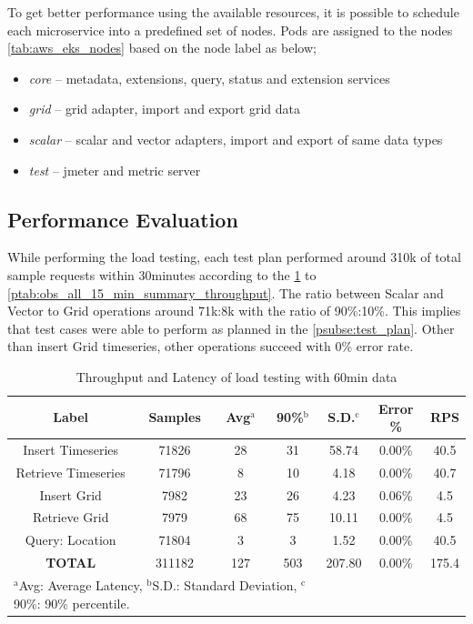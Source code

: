 \documentclass[conference]{IEEEtran}
\begin{document}
To get better performance using the available resources, it is possible to schedule each microservice into a predefined set of nodes. Pods are assigned to the nodes \cref{tab:aws_eks_nodes} based on the node label as below;
\begin{itemize}
    \item \emph{core} -- metadata, extensions, query, status and extension services
    \item \emph{grid} -- grid adapter, import and export grid data
    \item \emph{scalar} -- scalar and vector adapters, import and export of same data types
    \item \emph{test} -- \acrshort{jmeter} and metric server
\end{itemize}

\subsection{Performance Evaluation}
\label{psubse:performance_evaluation}

While performing the load testing, each test plan performed around 310k of total sample requests within 30minutes according to the \cref{ptab:obs_all_60_min_summary_throughput} to \cref{ptab:obs_all_15_min_summary_throughput}. The ratio between Scalar and Vector to Grid operations around 71k:8k with the ratio of 90\%:10\%. This implies that test cases were able to perform as planned in the \cref{psubse:test_plan}.
Other than insert Grid timeseries, other operations succeed with 0\% error rate.

\begin{table}[htbp]
\caption{ Throughput and Latency of load testing with 60min data}
\begin{center}
\footnotesize
\begin{adjustbox}{width=0.49\textwidth}
\begin{tabular}{|c|c|c|c|c|c|c|}
\hline
\textbf{Label} & \textbf{Samples} & \textbf{Avg$^{\mathrm{a}}$} & \textbf{90\%$^{\mathrm{b}}$} & \textbf{S.D.$^{\mathrm{c}}$} & \textbf{Error \%} & \textbf{RPS} \\ \hline
Insert Timeseries & 71826 & 28 & 31 & 58.74 & 0.00\% & 40.5 \\ \hline
Retrieve Timeseries & 71796 & 8 & 10 & 4.18 & 0.00\% & 40.7 \\ \hline
Insert Grid & 7982 & 23 & 26 & 4.23 & 0.06\% & 4.5 \\ \hline
Retrieve Grid & 7979 & 68 & 75 & 10.11 & 0.00\% & 4.5 \\ \hline
Query: Location & 71804 & 3 & 3 & 1.52 & 0.00\% & 40.5 \\ \hline
\textbf{TOTAL} & 311182 & 127 & 503 & 207.80 & 0.00\% & 175.4 \\ \hline
\multicolumn{4}{l}{$^{\mathrm{a}}$Avg: Average Latency, $^{\mathrm{b}}$S.D.: Standard Deviation, $^{\mathrm{c}}$90\%: 90\% percentile.}
\end{tabular}
\end{adjustbox}
\label{ptab:obs_all_60_min_summary_throughput}
\end{center}
\end{table}
\end{document}
